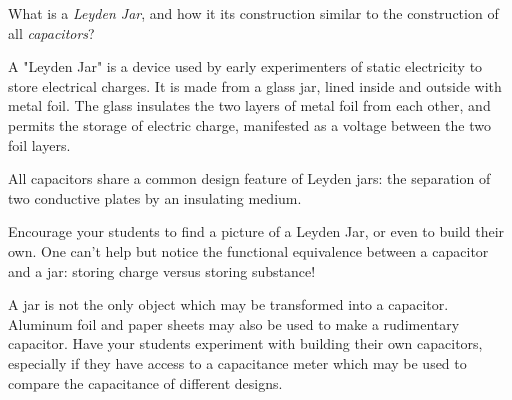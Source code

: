 

What is a {\it Leyden Jar}, and how it its construction similar to the construction of all {\it capacitors}?







A "Leyden Jar" is a device used by early experimenters of static electricity to store electrical charges.  It is made from a glass jar, lined inside and outside with metal foil.  The glass insulates the two layers of metal foil from each other, and permits the storage of electric charge, manifested as a voltage between the two foil layers.

All capacitors share a common design feature of Leyden jars: the separation of two conductive plates by an insulating medium.







Encourage your students to find a picture of a Leyden Jar, or even to build their own.  One can't help but notice the functional equivalence between a capacitor and a jar: storing charge versus storing substance!

A jar is not the only object which may be transformed into a capacitor.  Aluminum foil and paper sheets may also be used to make a rudimentary capacitor.  Have your students experiment with building their own capacitors, especially if they have access to a capacitance meter which may be used to compare the capacitance of different designs.




